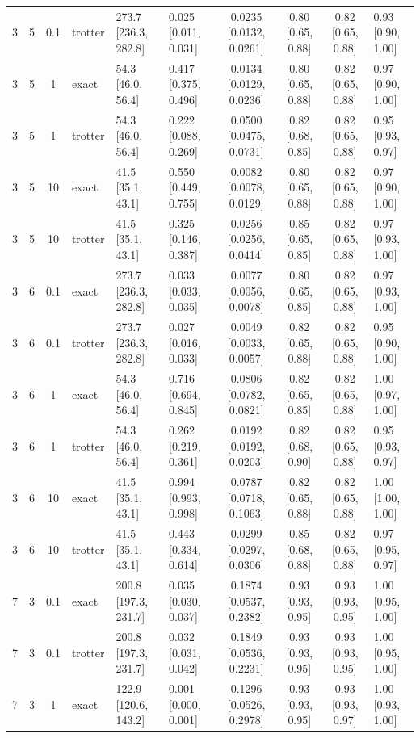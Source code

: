 \begin{tabular}{ccclllccc}
3 & 5 & 0.1 & trotter & 273.7 [236.3, 282.8] & 0.025 [0.011, 0.031] & 0.0235 [0.0132, 0.0261] & 0.80 [0.65, 0.88] & 0.82 [0.65, 0.88] & 0.93 [0.90, 1.00] \\
3 & 5 & 1 & exact & 54.3 [46.0, 56.4] & 0.417 [0.375, 0.496] & 0.0134 [0.0129, 0.0236] & 0.80 [0.65, 0.88] & 0.82 [0.65, 0.88] & 0.97 [0.90, 1.00] \\
3 & 5 & 1 & trotter & 54.3 [46.0, 56.4] & 0.222 [0.088, 0.269] & 0.0500 [0.0475, 0.0731] & 0.82 [0.68, 0.85] & 0.82 [0.65, 0.88] & 0.95 [0.93, 0.97] \\
3 & 5 & 10 & exact & 41.5 [35.1, 43.1] & 0.550 [0.449, 0.755] & 0.0082 [0.0078, 0.0129] & 0.80 [0.65, 0.88] & 0.82 [0.65, 0.88] & 0.97 [0.90, 1.00] \\
3 & 5 & 10 & trotter & 41.5 [35.1, 43.1] & 0.325 [0.146, 0.387] & 0.0256 [0.0256, 0.0414] & 0.85 [0.65, 0.85] & 0.82 [0.65, 0.88] & 0.97 [0.93, 1.00] \\
3 & 6 & 0.1 & exact & 273.7 [236.3, 282.8] & 0.033 [0.033, 0.035] & 0.0077 [0.0056, 0.0078] & 0.80 [0.65, 0.85] & 0.82 [0.65, 0.88] & 0.97 [0.93, 1.00] \\
3 & 6 & 0.1 & trotter & 273.7 [236.3, 282.8] & 0.027 [0.016, 0.033] & 0.0049 [0.0033, 0.0057] & 0.82 [0.65, 0.88] & 0.82 [0.65, 0.88] & 0.95 [0.90, 1.00] \\
3 & 6 & 1 & exact & 54.3 [46.0, 56.4] & 0.716 [0.694, 0.845] & 0.0806 [0.0782, 0.0821] & 0.82 [0.65, 0.85] & 0.82 [0.65, 0.88] & 1.00 [0.97, 1.00] \\
3 & 6 & 1 & trotter & 54.3 [46.0, 56.4] & 0.262 [0.219, 0.361] & 0.0192 [0.0192, 0.0203] & 0.82 [0.68, 0.90] & 0.82 [0.65, 0.88] & 0.95 [0.93, 0.97] \\
3 & 6 & 10 & exact & 41.5 [35.1, 43.1] & 0.994 [0.993, 0.998] & 0.0787 [0.0718, 0.1063] & 0.82 [0.65, 0.88] & 0.82 [0.65, 0.88] & 1.00 [1.00, 1.00] \\
3 & 6 & 10 & trotter & 41.5 [35.1, 43.1] & 0.443 [0.334, 0.614] & 0.0299 [0.0297, 0.0306] & 0.85 [0.68, 0.88] & 0.82 [0.65, 0.88] & 0.97 [0.95, 0.97] \\
7 & 3 & 0.1 & exact & 200.8 [197.3, 231.7] & 0.035 [0.030, 0.037] & 0.1874 [0.0537, 0.2382] & 0.93 [0.93, 0.95] & 0.93 [0.93, 0.95] & 1.00 [0.95, 1.00] \\
7 & 3 & 0.1 & trotter & 200.8 [197.3, 231.7] & 0.032 [0.031, 0.042] & 0.1849 [0.0536, 0.2231] & 0.93 [0.93, 0.95] & 0.93 [0.93, 0.95] & 1.00 [0.95, 1.00] \\
7 & 3 & 1 & exact & 122.9 [120.6, 143.2] & 0.001 [0.000, 0.001] & 0.1296 [0.0526, 0.2978] & 0.93 [0.93, 0.95] & 0.93 [0.93, 0.97] & 1.00 [0.93, 1.00] \\

\end{tabular}
